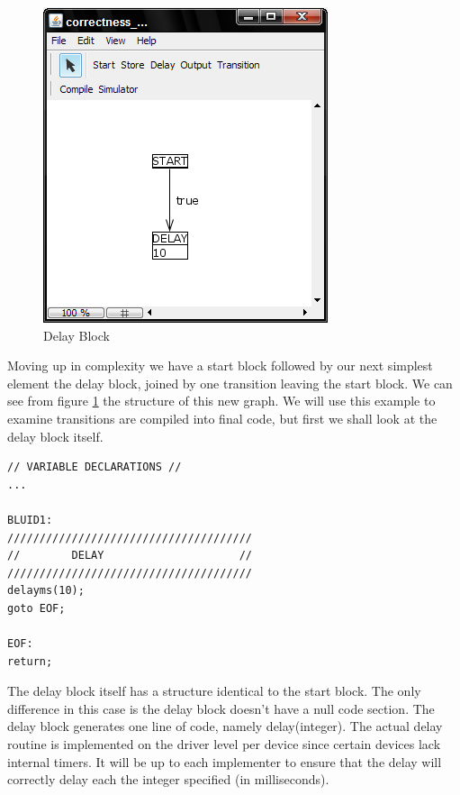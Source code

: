 \begin{figure}[htb]
	\centering
	\includegraphics[width=\imgmedphoto]{./images/correctness_ex_delay.png}
	\caption{Delay Block}
	\label{fig:correctness_ex_delay}
\end{figure}

Moving up in complexity we have a start block followed by our next simplest element the delay block, joined by one transition leaving the start block. We can see from figure \ref{fig:correctness_ex_delay}
the structure of this new graph. We will use this example to examine transitions are compiled into final code, but first we shall look at the delay block itself.

\begin{minipage}{\textwidth}
\begin{lstlisting}[frame=single]
// VARIABLE DECLARATIONS //
...

BLUID1:
//////////////////////////////////////
//        DELAY                     //
//////////////////////////////////////
delayms(10);
goto EOF;

EOF:
return;
\end{lstlisting}
\end{minipage}

The delay block itself has a structure identical to the start block. The only difference in this case is the delay block doesn't have a null code section. The delay block generates one line of code, namely delay(integer). The actual delay routine is implemented on the driver level per device since certain devices lack internal timers. It will be up to each implementer to ensure that the delay will correctly delay each the integer specified (in milliseconds). 


